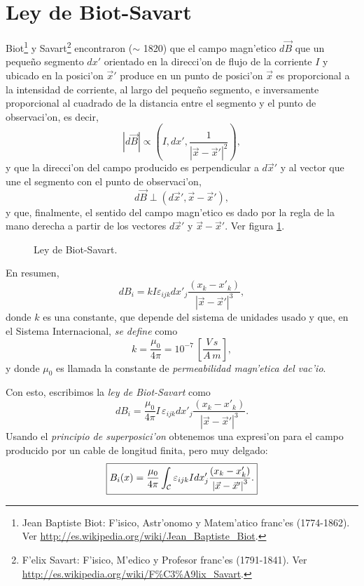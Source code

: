 \section{Ley de Biot-Savart}
Biot\footnote{Jean Baptiste Biot: F'isico, Astr'onomo y Matem'atico franc'es (1774-1862). Ver \url{http://es.wikipedia.org/wiki/Jean_Baptiste_Biot}.} y Savart\footnote{F'elix Savart: F'isico, M'edico y Profesor franc'es (1791-1841). Ver \url{http://es.wikipedia.org/wiki/F\%C3\%A9lix_Savart}.} encontraron ($\sim$ 1820) que el campo magn'etico $d\vec{B}$ que un peque\~no segmento $dx'$ orientado en la direcci'on de flujo de la corriente $I$ y ubicado en la posici'on $\vec{x}'$ produce en un punto de posici'on $\vec{x}$ es proporcional a la intensidad de corriente, al largo del
peque\~no segmento, e inversamente proporcional al cuadrado de la distancia
entre el segmento y el punto de observaci'on, es decir,
\begin{equation}
 \left\vert d\vec{B}\right\vert \propto
\left(I,dx',\frac{1}{\left|\vec{x}-\vec{x}'\right|^2}\right),
\end{equation}
y que la direcci'on del campo producido es perpendicular a $d\vec{x}'$ y al
vector que une el segmento con el punto de observaci'on,
\begin{equation}
d\vec{B}  \perp\left(  d\vec{x}', \vec{x}-\vec{x}' \right) ,
\end{equation}
y que, finalmente, el sentido del campo magn'etico es dado por la regla de la mano derecha a partir de los vectores $d\vec{x}'$ y $\vec{x}-\vec{x}'$. Ver figura \ref{fBS1}. 
\begin{figure}[!h]
\centerline{}
\label{Esquema para la ley de Biot-Savart.}
\label{fBS1}
\caption{Ley de Biot-Savart.}
\end{figure}
En resumen,
\begin{equation}
dB_i=kI\varepsilon_{ijk}dx'_j\frac{\left(x_k-x'_k\right)}{\left\vert
\vec{x}-\vec{x}'\right\vert^3},
\end{equation}
donde $k$ es una constante, que depende del sistema de unidades usado y que,
en el Sistema Internacional, \textit{se define} como
\begin{equation}
k=\frac{\mu_0}{4\pi}=10^{-7}~\left[  \frac{V\,s}{A\,m}\right],
\end{equation}
y donde $\mu_0$ es llamada la constante de \textit{permeabilidad magn'etica del vac'io}.

Con esto, escribimos la \textit{ley de Biot-Savart} como
\begin{equation}
dB_i=\frac{\mu_0}{4\pi}I\,\varepsilon_{ijk}dx'_j\frac{\left(x_k-x'_k\right)}
{\left\vert \vec{x}-\vec{x}'\right\vert ^3}.
\end{equation}
Usando el \textit{principio de superposici'on} obtenemos una expresi'on para el campo producido por un cable de longitud finita, pero muy delgado:
\begin{equation}
\boxed{B_i(x)=\frac{\mu_0}{4\pi}\int_{\cal C}\varepsilon_{ijk}Idx'_j
\frac{\left(x_k-x'_k\right)}{\left\vert\vec{x}-\vec{x}'\right\vert^3}.}
\label{BS1}
\end{equation}

